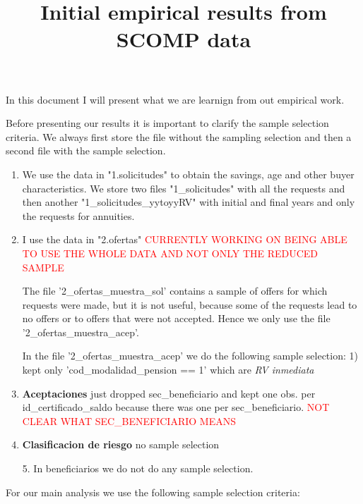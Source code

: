 \documentclass[12pt]{article}
\begin{document}
\title{Initial empirical results from SCOMP data}

\maketitle

In this document I will present what we are learnign from out empirical work. 

Before presenting our results it is important to clarify the sample selection criteria. We always first store the file without the sampling selection and then a second file with the sample selection. 

\begin{enumerate}
    \item We use the data in "1.solicitudes" to obtain the savings, age and other buyer characteristics. We store two files "1\_solicitudes" with all the requests and then another "1\_solicitudes\_yytoyyRV" with initial and final years and only the requests for annuities. 

    \item I use the data in "2.ofertas" \textcolor{red}{CURRENTLY WORKING ON BEING ABLE TO USE THE WHOLE DATA AND NOT ONLY THE REDUCED SAMPLE}
    
    The file '2\_ofertas\_muestra\_sol' contains a sample of offers for which requests were made, but it is not useful, because some of the requests lead to no offers or to offers that were not accepted. Hence we only use the file '2\_ofertas\_muestra\_acep'. 

    In the file '2\_ofertas\_muestra\_acep' we do the following sample selection: 1) kept only 'cod\_modalidad\_pension == 1' which are \textit{RV inmediata} 


    \item \textbf{Aceptaciones} just dropped sec\_beneficiario and kept one obs. per id\_certificado\_saldo because there was one per sec\_beneficiario. 
    \textcolor{red}{NOT CLEAR WHAT SEC\_BENEFICIARIO MEANS}

    \item \textbf{Clasificacion de riesgo} no sample selection

    \item[5.] In beneficiarios we do not do any sample selection. 
\end{enumerate}



For our main analysis we use the following sample selection criteria: 
\end{document}
